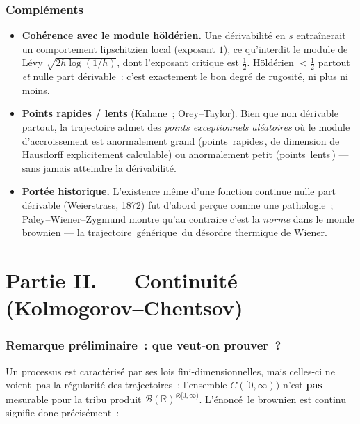 \documentclass[11pt,a4paper]{article}
\providecommand{\og}{\guillemotleft\,}
\providecommand{\fg}{\,\guillemotright}
\theoremstyle{plain}
\theoremstyle{definition}
\newcommand{\R}{\mathbb{R}}
\newcommand{\B}{\mathcal{B}}
\begin{document}
\section{Compl\'ements}

\begin{itemize}[leftmargin=1.4em,itemsep=4pt]
\item \textbf{Coh\'erence avec le module h\"old\'erien.} Une d\'erivabilit\'e en $s$ entra\^inerait un comportement lipschitzien local (exposant $1$), ce qu'interdit le module de L\'evy $\sqrt{2h\log(1/h)}$, dont l'exposant critique est $\tfrac12$. H\"old\'erien $<\tfrac12$ partout \emph{et} nulle part d\'erivable~: c'est exactement le bon degr\'e de rugosit\'e, ni plus ni moins.
\item \textbf{Points rapides / lents} (Kahane~; Orey--Taylor). Bien que non d\'erivable partout, la trajectoire admet des \emph{points exceptionnels al\'eatoires} o\`u le module d'accroissement est anormalement grand (points \og rapides\fg, de dimension de Hausdorff explicitement calculable) ou anormalement petit (points \og lents\fg) --- sans jamais atteindre la d\'erivabilit\'e.
\item \textbf{Port\'ee historique.} L'existence m\^eme d'une fonction continue nulle part d\'erivable (Weierstrass, 1872) fut d'abord per\c cue comme une pathologie~; Paley--Wiener--Zygmund montre qu'au contraire c'est la \emph{norme} dans le monde brownien --- la trajectoire \og g\'en\'erique\fg{} du d\'esordre thermique de Wiener.
\end{itemize}

\part*{Partie II. — Continuit\'e (Kolmogorov--Chentsov)}

\section{Remarque pr\'eliminaire~: que veut-on prouver~?}

Un processus est caract\'eris\'e par ses lois fini-dimensionnelles, mais celles-ci ne \og voient\fg{} pas la r\'egularit\'e des trajectoires~: l'ensemble $C([0,\infty))$ n'est \textbf{pas} mesurable pour la tribu produit $\B(\R)^{\otimes[0,\infty)}$. L'\'enonc\'e \og le brownien est continu\fg{} signifie donc pr\'ecis\'ement~:
\end{document}
